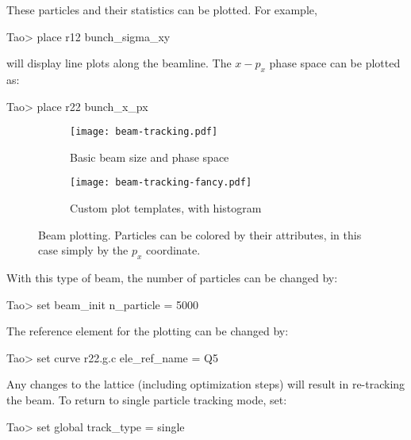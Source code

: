 \documentclass{hitec}     %
\begin{document}
{These particles and their statistics can be plotted. For example,
\begin{code}
Tao> place r12 bunch_sigma_xy
\end{code}
will display line plots along the beamline.
The $x-p_x$ phase space can be plotted as:
\begin{code}
Tao> place r22 bunch_x_px
\end{code}

\begin{figure}[tb]
  \centering
  \begin{subfigure}[t]{.45\textwidth}
    \texttt{[image: beam-tracking.pdf]}
    \caption{Basic beam size and phase space}
    \label{f:beam-tracking}
  \end{subfigure}
  \hfil
  \begin{subfigure}[t]{0.49\textwidth}
    \texttt{[image: beam-tracking-fancy.pdf]}
    \caption{Custom plot templates, with histogram}
    \label{f:beam-tracking-fancy}
  \end{subfigure}
  \caption{Beam plotting. Particles can be colored by their attributes, in this case simply by the $p_x$ coordinate.  }
\end{figure}

With this type of beam, the number of particles can be changed by:
\begin{code}
Tao> set beam_init n_particle = 5000
\end{code}

The reference element for the plotting can be changed by:
\begin{code}
Tao> set curve r22.g.c ele_ref_name = Q5
\end{code}

Any changes to the lattice (including optimization steps) will result in re-tracking the beam. To
return to single particle tracking mode, set:
\begin{code}
Tao> set global track_type = single
\end{code}

%

}
\end{document}
